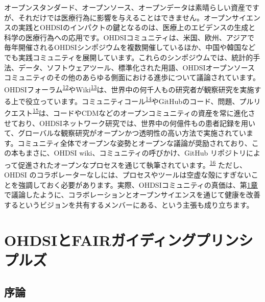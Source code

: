 \documentclass[
  11pt]{book}
\theoremstyle{definition}
\theoremstyle{definition}
\theoremstyle{definition}
\theoremstyle{definition}
\theoremstyle{remark}
\begin{document}
オープンスタンダード、オープンソース、オープンデータは素晴らしい資産ですが、それだけでは医療行為に影響を与えることはできません。オープンサイエンスの実践とOHDSIのインパクトの鍵となるのは、医療上のエビデンスの生成と科学の医療行為への応用です。OHDSIコミュニティは、米国、欧州、アジアで毎年開催されるOHDSIシンポジウムを複数開催しているほか、中国や韓国などでも実践コミュニティを展開しています。これらのシンポジウムでは、統計的手法、データ、ソフトウェアツール、標準化された用語、OHDSIオープンソースコミュニティのその他のあらゆる側面における進歩について議論されています。OHDSIフォーラム\textsuperscript{\href{https://ohdsi.github.io/TheBookOfOhdsi/OpenScience.html\#fn12}{12}}やWiki\textsuperscript{\href{https://ohdsi.github.io/TheBookOfOhdsi/OpenScience.html\#fn13}{13}}は、世界中の何千人もの研究者が観察研究を実施する上で役立っています。コミュニティコール\textsuperscript{\href{https://ohdsi.github.io/TheBookOfOhdsi/OpenScience.html\#fn14}{14}}やGitHubのコード、問題、プルリクエスト\textsuperscript{\href{https://ohdsi.github.io/TheBookOfOhdsi/OpenScience.html\#fn15}{15}}は、コードやCDMなどのオープンコミュニティの資産を常に進化させており、OHDSIネットワーク研究では、世界中の何億件もの患者記録を用いて、グローバルな観察研究がオープンかつ透明性の高い方法で実施されています。コミュニティ全体でオープンな姿勢とオープンな議論が奨励されており、この本もまさに、OHDSI wiki、コミュニティの呼びかけ、GitHub リポジトリによって促進されたオープンなプロセスを通じて執筆されています。\textsuperscript{\href{https://ohdsi.github.io/TheBookOfOhdsi/OpenScience.html\#fn16}{16}} ただし、OHDSI のコラボレーターなしには、プロセスやツールは空虚な殻にすぎないことを強調しておく必要があります。実際、OHDSIコミュニティの真価は、第\href{https://ohdsi.github.io/TheBookOfOhdsi/OhdsiCommunity.html\#OhdsiCommunity}{1章}で議論したように、コラボレーションとオープンサイエンスを通じて健康を改善するというビジョンを共有するメンバーにある、という主張も成り立ちます。

\section{OHDSIとFAIRガイディングプリンシプルズ}\label{ohdsiux3068fairux30acux30a4ux30c7ux30a3ux30f3ux30b0ux30d7ux30eaux30f3ux30b7ux30d7ux30ebux30ba}


\subsection{序論}\label{ux5e8fux8ad6}
\end{document}
